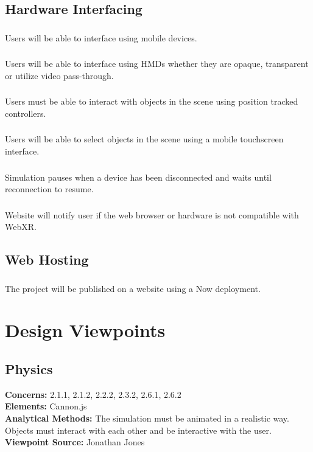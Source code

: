 \documentclass[onecolumn, draftclsnofoot,10pt, compsoc]{IEEEtran}
\begin{document}
\subsection{Hardware Interfacing}
\subsubsection{}
Users will be able to interface using mobile devices.
\subsubsection{}
Users will be able to interface using HMDs whether they are opaque, transparent or utilize video pass-through.
\subsubsection{}
Users must be able to interact with objects in the scene using position tracked controllers.
\subsubsection{}
Users will be able to select objects in the scene using a mobile touchscreen interface.
\subsubsection{}
Simulation pauses when a device has been disconnected and waits until reconnection to resume.
\subsubsection{}
Website will notify user if the web browser or hardware is not compatible with WebXR.

\subsection{Web Hosting}
\subsubsection{}
The project will be published on a website using a Now deployment.

\section{Design Viewpoints}

\subsection{Physics}
\textbf{Concerns:}  2.1.1, 2.1.2, 2.2.2, 2.3.2, 2.6.1, 2.6.2\\
\textbf{Elements:} Cannon.js\\
\textbf{Analytical Methods:} The simulation must be animated in a realistic way. Objects must interact with each other and be interactive with the user.\\
\textbf{Viewpoint Source:} Jonathan Jones
\end{document}
